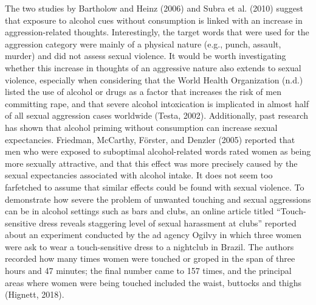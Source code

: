 \documentclass[authordate, serif, review]{jote-article}
\begin{document}
\begin{multicols}{2}
The two studies by Bartholow and Heinz (2006) and Subra et al. (2010) suggest that exposure to alcohol cues without consumption is linked with an increase in aggression-related thoughts. Interestingly, the target words that were used for the aggression category were mainly of a physical nature (e.g., punch, assault, murder) and did not assess sexual violence. It would be worth investigating whether this increase in thoughts of an aggressive nature also extends to sexual violence, especially when considering that the World Health Organization (n.d.) listed the use of alcohol or drugs as a factor that increases the risk of men committing rape, and that severe alcohol intoxication is implicated in almost half of all sexual aggression cases worldwide (Testa, 2002). Additionally, past research has shown that alcohol priming without consumption can increase sexual expectancies. Friedman, McCarthy, Förster, and Denzler (2005) reported that men who were exposed to suboptimal alcohol-related words rated women as being more sexually attractive, and that this effect was more precisely caused by the sexual expectancies associated with alcohol intake. It does not seem too farfetched to assume that similar effects could be found with sexual violence. To demonstrate how severe the problem of unwanted touching and sexual aggressions can be in alcohol settings such as bars and clubs, an online article titled ``Touch-sensitive dress reveals staggering level of sexual harassment at clubs'' reported about an experiment conducted by the ad agency Ogilvy in which three women were ask to wear a touch-sensitive dress to a nightclub in Brazil. The authors recorded how many times women were touched or groped in the span of three hours and 47 minutes; the final number came to 157 times, and the principal areas where women were being touched included the waist, buttocks and thighs (Hignett, 2018). 


\end{multicols}
\end{document}
